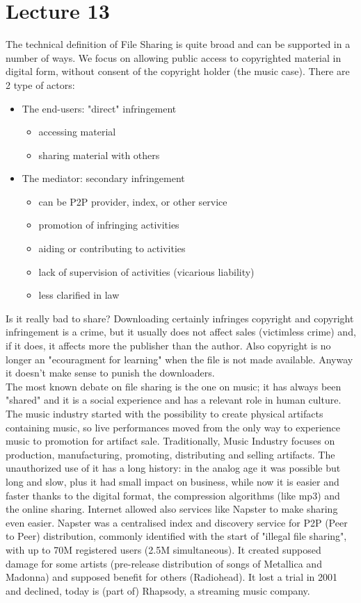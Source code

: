 \documentclass[a4paper, 10pt, titlepage]{article}
\begin{document}
\section{Lecture 13}
The technical definition of File Sharing is quite broad and can be supported in a number of ways. We focus on allowing public access to copyrighted material in digital form, without consent of the copyright holder (the music case). There are 2 type of actors:
\begin{itemize}
\item The end-users: "direct" infringement
\begin{itemize}
\item accessing material
\item sharing material with others
\end{itemize}
\item The mediator: secondary infringement
\begin{itemize}
\item can be P2P provider, index, or other service
\item promotion of infringing activities
\item aiding or contributing to activities
\item lack of supervision of activities (vicarious liability)
\item less clarified in law
\end{itemize} 
\end{itemize}
Is it really bad to share? Downloading certainly infringes copyright
and copyright infringement is a crime, but it usually does not affect sales (victimless crime) and, if it does, it affects more the publisher than the author. Also copyright is no longer an "ecouragment for learning" when the file is not made available.
Anyway it doesn't make sense to punish the downloaders. \medskip\\
The most known debate on file sharing is the one on music; it has always been "shared" and it is a social experience and has a relevant role in human culture. The music industry started with the possibility to create physical artifacts containing music, so live performances moved from the only way to experience music to promotion for artifact sale. Traditionally, Music Industry focuses on production, manufacturing, promoting, distributing and selling artifacts. The unauthorized use of it has a long history: in the analog age it was possible but long and slow, plus it had small impact on business, while now it is easier and faster thanks to the digital format, the compression algorithms (like mp3) and the online sharing. Internet allowed also services like Napster to make sharing even easier. Napster was a centralised index and discovery service for P2P (Peer to Peer) distribution, commonly identified with the start of "illegal file sharing", with up to 70M registered users (2.5M simultaneous). It created supposed damage for some artists (pre-release distribution of songs of Metallica and Madonna) and supposed benefit for others (Radiohead). It lost a trial in 2001 and declined, today is (part of) Rhapsody, a streaming music company.
\end{document}
